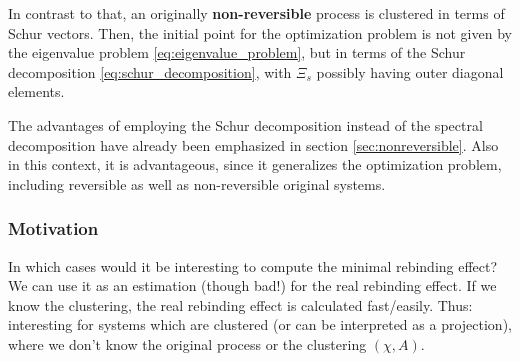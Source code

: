 In contrast to that, an originally \textbf{non-reversible} process is clustered in terms of Schur vectors.
Then, the initial point for the optimization problem is not given by the eigenvalue problem \eqref{eq:eigenvalue_problem}, but in terms of the Schur decomposition \eqref{eq:schur_decomposition},
with $\Xi_s$ possibly having outer diagonal elements.




The advantages of employing the Schur decomposition instead of the spectral decomposition have already been emphasized in section \ref{sec:nonreversible}. Also in this context, 
it is advantageous, since it generalizes the optimization problem, including reversible as well as non-reversible original systems.


\subsubsection*{Motivation}

In which cases would it be interesting to compute the minimal rebinding effect? We can use it as an estimation (though bad!) for the real rebinding effect.
If we know the clustering, the real rebinding effect is calculated fast/easily.
Thus: interesting for systems which are clustered (or can be interpreted as a projection), where we don't know the original process or the clustering $(\chi,A)$.
\\

